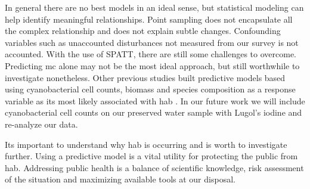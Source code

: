 In general there are no best models in an ideal sense, but statistical modeling can help identify meaningful relationships. Point sampling does not encapsulate all the complex relationship and does not explain subtle changes. Confounding variables such as unaccounted disturbances not measured from our survey is not accounted. With the use of SPATT, there are still some challenges to overcome. Predicting \gls{mc} alone may not be the most ideal approach, but still worthwhile to investigate nonetheless. Other previous studies built predictive models based using cyanobacterial cell counts, biomass and species composition as a response variable as its most likely associated with \gls{hab} \cite{moore_richard_cyanobacterial_1993, ahn_evaluation_2011, jiang_statistical_2008, beaulieu_nutrients_2013, taranu_predicting_2017}. In our future work we will include cyanobacterial cell counts on our preserved water sample with Lugol's iodine and re-analyze our data.

Its important to understand why \gls{hab} is occurring and is worth to investigate further. Using a predictive model is a vital utility for protecting the public from \gls{hab}. Addressing public health is a balance of scientific knowledge, risk assessment of the situation and maximizing available tools at our disposal. 






